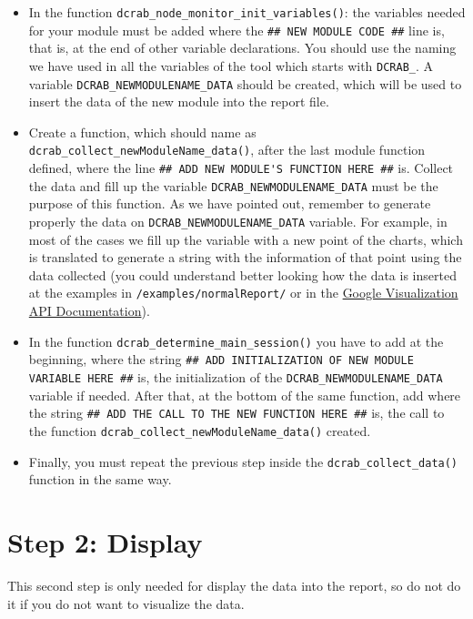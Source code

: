 \documentclass[10pt,a4paper]{report}
\begin{document}
\begin{itemize}
  \item In the function \texttt{dcrab\_node\_monitor\_init\_variables()}: the variables needed for your module must be added where the \verb+## NEW MODULE CODE ##+ line is, that is, at the end of other variable declarations. You should use the naming we have used in all the variables of the tool which starts with \verb+DCRAB_+. A variable \verb+DCRAB_NEWMODULENAME_DATA+ should be created, which will be used to insert the data of the new module into the report file.
  \item Create a function, which should name as \texttt{dcrab\_collect\_newModuleName\_data()}, after the last module function defined, where the line \verb+## ADD NEW MODULE'S FUNCTION HERE ##+ is. Collect the data and fill up the variable \verb+DCRAB_NEWMODULENAME_DATA+ must be the purpose of this function. As we have pointed out, remember to generate properly the data on \verb+DCRAB_NEWMODULENAME_DATA+ variable. For example, in most of the cases we fill up the variable with a new point of the charts, which is translated to generate a string with the information of that point using the data collected (you could understand better looking how the data is inserted at the examples in \verb+/examples/normalReport/+ or in the \href{https://developers.google.com/chart/interactive/docs/reference}{Google Visualization API Documentation}).
  \item In the function \texttt{dcrab\_determine\_main\_session()} you have to add at the beginning, where the string \verb+## ADD INITIALIZATION OF NEW MODULE VARIABLE HERE ##+ is, the initialization of the \verb+DCRAB_NEWMODULENAME_DATA+ variable if needed. After that, at the bottom of the same function, add where the string \verb+## ADD THE CALL TO THE NEW FUNCTION HERE ##+ is, the call to the function \texttt{dcrab\_collect\_newModuleName\_data()} created.
  \item Finally, you must repeat the previous step inside the \texttt{dcrab\_collect\_data()} function in the same way.
\end{itemize}

\section{Step 2: Display}

This second step is only needed for display the data into the report, so do not do it if you do not want to visualize the data.
\end{document}
